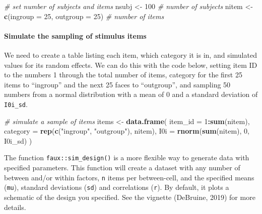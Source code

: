 \documentclass[man,floatsintext]{apa6}
\newenvironment{Shaded}{\begin{snugshade}}{\end{snugshade}}
\newcommand{\CommentTok}[1]{\textcolor[rgb]{0.56,0.35,0.01}{\textit{#1}}}
\newcommand{\DataTypeTok}[1]{\textcolor[rgb]{0.13,0.29,0.53}{#1}}
\newcommand{\DecValTok}[1]{\textcolor[rgb]{0.00,0.00,0.81}{#1}}
\newcommand{\KeywordTok}[1]{\textcolor[rgb]{0.13,0.29,0.53}{\textbf{#1}}}
\newcommand{\NormalTok}[1]{#1}
\newcommand{\OperatorTok}[1]{\textcolor[rgb]{0.81,0.36,0.00}{\textbf{#1}}}
\newcommand{\StringTok}[1]{\textcolor[rgb]{0.31,0.60,0.02}{#1}}
\let\oldparagraph\paragraph
\renewcommand{\paragraph}[1]{\oldparagraph{#1}\mbox{}}
\begin{document}
\begin{Shaded}
\begin{Highlighting}[]
\CommentTok{# set number of subjects and items}
\NormalTok{nsubj  <-}\StringTok{ }\DecValTok{100} \CommentTok{# number of subjects}
\NormalTok{nitem  <-}\StringTok{ }\KeywordTok{c}\NormalTok{(}\DataTypeTok{ingroup =} \DecValTok{25}\NormalTok{, }\DataTypeTok{outgroup =} \DecValTok{25}\NormalTok{)  }\CommentTok{# number of items}
\end{Highlighting}
\end{Shaded}

\hypertarget{simulate-the-sampling-of-stimulus-items}{%
\paragraph{Simulate the sampling of stimulus items}\label{simulate-the-sampling-of-stimulus-items}}

We need to create a table listing each item, which category it is in, and simulated values for its random effects. We can do this with the code below, setting item ID to the numbers 1 through the total number of items, category for the first 25 items to \enquote{ingroup} and the next 25 faces to \enquote{outgroup}, and sampling 50 numbers from a normal distribution with a mean of 0 and a standard deviation of \texttt{I0i\_sd}.

\begin{Shaded}
\begin{Highlighting}[]
\CommentTok{# simulate a sample of items}
\NormalTok{items <-}\StringTok{ }\KeywordTok{data.frame}\NormalTok{(}
  \DataTypeTok{item_id =} \DecValTok{1}\OperatorTok{:}\KeywordTok{sum}\NormalTok{(nitem),}
  \DataTypeTok{category =} \KeywordTok{rep}\NormalTok{(}\KeywordTok{c}\NormalTok{(}\StringTok{"ingroup"}\NormalTok{, }\StringTok{"outgroup"}\NormalTok{), nitem),}
  \DataTypeTok{I0i =} \KeywordTok{rnorm}\NormalTok{(}\KeywordTok{sum}\NormalTok{(nitem), }\DecValTok{0}\NormalTok{, I0i_sd)}
\NormalTok{)}
\end{Highlighting}
\end{Shaded}

The function \texttt{faux::sim\_design()} is a more flexible way to generate data with specified parameters. This function will create a dataset with any number of between and/or within factors, \texttt{n} items per between-cell, and the specified means (\texttt{mu}), standard deviations (\texttt{sd}) and correlations (\texttt{r}). By default, it plots a schematic of the design you specified. See the vignette (DeBruine, 2019) for more details.
\end{document}
